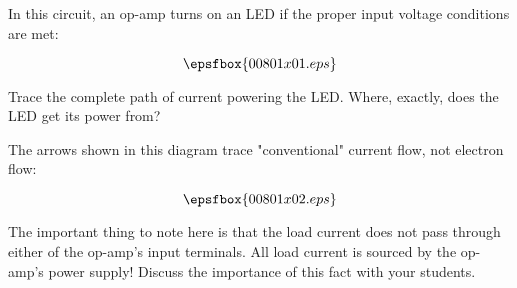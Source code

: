 

In this circuit, an op-amp turns on an LED if the proper input voltage conditions are met:

$$\epsfbox{00801x01.eps}$$

Trace the complete path of current powering the LED.  Where, exactly, does the LED get its power from?







The arrows shown in this diagram trace "conventional" current flow, not electron flow:

$$\epsfbox{00801x02.eps}$$







The important thing to note here is that the load current does not pass through either of the op-amp's input terminals.  All load current is sourced by the op-amp's power supply!  Discuss the importance of this fact with your students.




